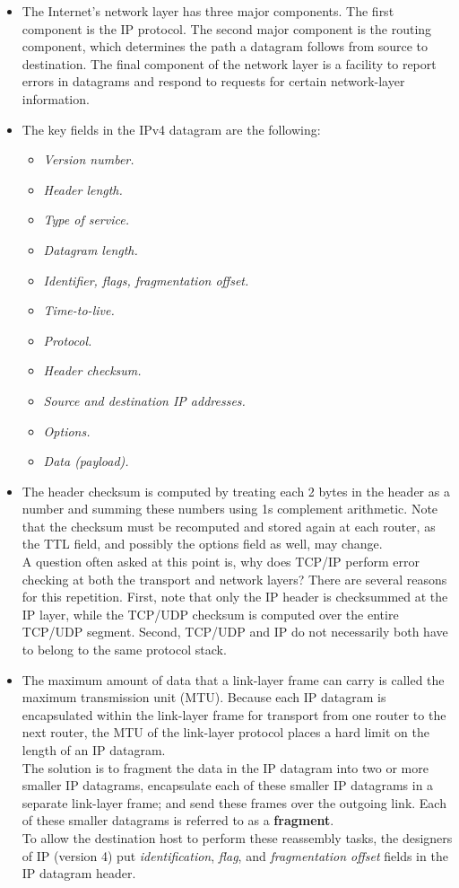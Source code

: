 \begin{itemize}
\item
The Internet's network layer has three major components. The first component is the IP protocol. The second major component is the routing component, which determines the path a datagram follows from source to destination. The final component of the network layer is a facility to report errors in datagrams and respond to requests for certain network-layer information.

\item
The key fields in the IPv4 datagram are the following:
\begin{itemize}
\item\textit{Version number.}
\item\textit{Header length.}
\item\textit{Type of service.}
\item\textit{Datagram length.}
\item\textit{Identifier, flags, fragmentation offset.}
\item\textit{Time-to-live.}
\item\textit{Protocol.}
\item\textit{Header checksum.}
\item\textit{Source and destination IP addresses.}
\item\textit{Options.}
\item\textit{Data (payload).}
\end{itemize}

\item
The header checksum is computed by treating each 2 bytes in the header as a number and summing these numbers using 1s complement arithmetic. Note that the checksum must be recomputed and stored again at each router, as the TTL field, and possibly the options field as well, may change.\\
A question often asked at this point is, why does TCP/IP perform error checking at both the transport and network layers? There are several reasons for this repetition. First, note that only the IP header is checksummed at the IP layer, while the TCP/UDP checksum is computed over the entire TCP/UDP segment. Second, TCP/UDP and IP do not necessarily both have to belong to the same protocol stack.

\item
The maximum amount of data that a link-layer frame can carry is called the maximum transmission unit (MTU). Because each IP datagram is encapsulated within the link-layer frame for transport from one router to the next router, the MTU of the link-layer protocol places a hard limit on the length of an IP datagram.\\
The solution is to fragment the data in the IP datagram into two or more smaller IP datagrams, encapsulate each of these smaller IP datagrams in a separate link-layer frame; and send these frames over the outgoing link. Each of these smaller datagrams is referred to as a \textbf{fragment}.\\
To allow the destination host to perform these reassembly tasks, the designers of IP (version 4) put \textit{identification}, \textit{flag}, and \textit{fragmentation offset} fields in the IP datagram header.


\end{itemize}
